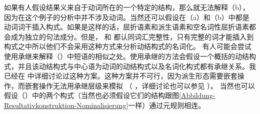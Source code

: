 %
    如果有人假设结果义来自于动词所在的一个特定的结构，那么就无法解释（b），因为在这个例子的分析中并不涉及动词。当然还可以假设在（a）和（b）中都是动词词干插入构式。如果是这样的话，屈折语素和派生语素和空名词性屈折语素都会成为独立的句法成分。但是， \citet[]{Goldberg2003a}和 \citet{ADT2013a}都认同词汇完整性，只有完整的词才能插入到构式之中所以他们不会采用这种方式来分析动结构式的名词化。
    有人可能会尝试使用承继来解释（）中短语的相似之处。使用承继的方法会假设一个概括的动结构式，并且该动结构式与中心语为动词的动结构式以及名词化构式都有承继关系。我已经在 中详细讨论过这种方案。这种方案并不可行，因为派生形态需要嵌套操作，而嵌套操作无法用承继层级来模拟 （ ，详细讨论也可以参见 ）。
    当然也可以假设（）中的两个构式（当然也必须假设它们的结构跟图\ref{Abbildung-Resultativkonstruktion-Nominalisierung}一样）通过元规则相连。
